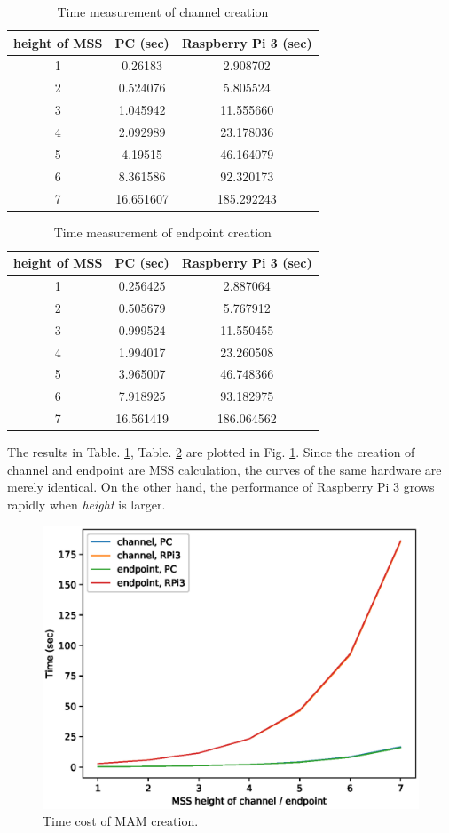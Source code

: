\documentclass[journal,article,applsci,submit,moreauthors,pdftex]{Definitions/mdpi}
\begin{document}
\begin{table}[H]
	\caption{Time measurement of channel creation}
	\centering
	\label{tab:channel_create}
	\begin{tabular}{ccc}
	\toprule
		\textbf{height of MSS} & \textbf{PC (sec)} & \textbf{Raspberry Pi 3 (sec)} \\ 
		\midrule
		1 & 0.26183 & 2.908702 \\ 
		2 & 0.524076 & 5.805524 \\ 
		3 & 1.045942 & 11.555660 \\ 
		4 & 2.092989 & 23.178036 \\ 
		5 & 4.19515 & 46.164079\\ 
		6 & 8.361586 & 92.320173\\ 
		7 & 16.651607 & 185.292243\\
		\bottomrule
	\end{tabular}
\end{table}

\begin{table}[H]
	\caption{Time measurement of endpoint creation}
	\centering
	\label{tab:endpoint_create}
	\begin{tabular}{ccc}
	\toprule
		\textbf{height of MSS} & \textbf{PC (sec)} & \textbf{Raspberry Pi 3 (sec)} \\ 
		\midrule
		1 & 0.256425 & 2.887064 \\ 
		2 & 0.505679 & 5.767912 \\ 
		3 & 0.999524 & 11.550455 \\ 
		4 & 1.994017 & 23.260508 \\ 
		5 & 3.965007 & 46.748366 \\ 
		6 & 7.918925 & 93.182975 \\ 
		7 & 16.561419 & 186.064562 \\
		\bottomrule
	\end{tabular}
\end{table}

The results in Table.  \ref{tab:channel_create}, Table. \ref{tab:endpoint_create} are plotted in Fig. \ref{fig:mam_create}. Since the creation of channel and endpoint are MSS calculation, the curves of the same hardware are merely identical. On the other hand, the performance of Raspberry Pi 3 grows rapidly when \textit{height} is larger.
  
\begin{figure}[H]
    \centering
    \includegraphics[width=3.3 in]{mam_create}
    \caption{Time cost of MAM creation.}
    \label{fig:mam_create}
\end{figure}
\end{document}
